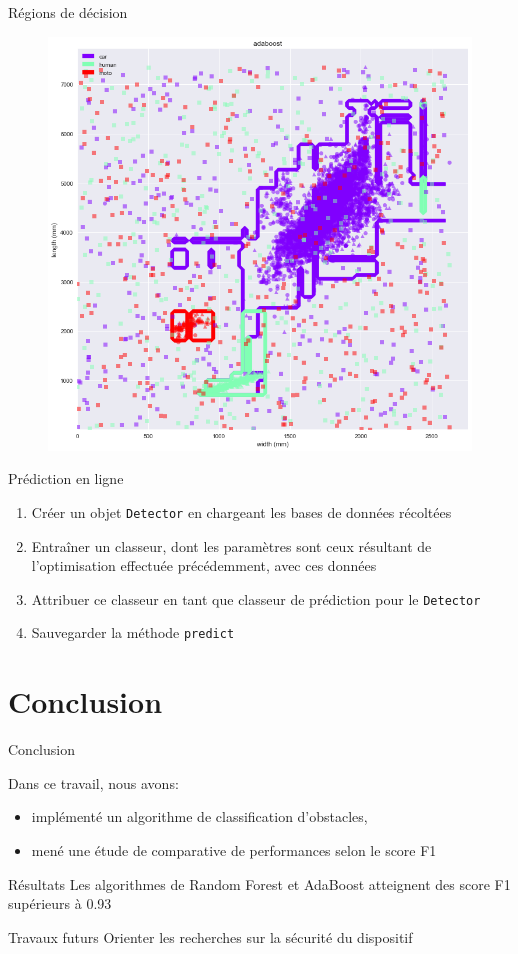 \documentclass[usenames,dvipsnames]{beamer}
\begin{document}
\begin{frame}{Régions de décision}
\begin{figure}
\centering
\includegraphics[width=.65\textwidth]{img/adaboost_contour.png}
\end{figure}
\end{frame}

\begin{frame}{Prédiction en ligne}
\begin{enumerate}
\item Créer un objet \texttt{Detector} en chargeant les bases de données récoltées
\item Entraîner un classeur, dont les paramètres sont ceux résultant de l'optimisation effectuée précédemment, avec ces données
\item Attribuer ce classeur en tant que classeur de prédiction pour le \texttt{Detector}
\item Sauvegarder la méthode \texttt{predict}
\end{enumerate}
\end{frame}

\section{Conclusion}
\begin{frame}{Conclusion}

Dans ce travail, nous avons:
\begin{itemize}

\item implémenté un algorithme de classification d’obstacles,

\item mené une étude de comparative de performances selon le score F1

\end{itemize} 

\medskip
\begin{block}{Résultats}
Les algorithmes de Random Forest et AdaBoost atteignent des score F1 supérieurs à 0.93
\end{block}


\begin{block}{Travaux futurs}
Orienter les recherches sur la sécurité du dispositif
\end{block}


\end{frame}
\end{document}
